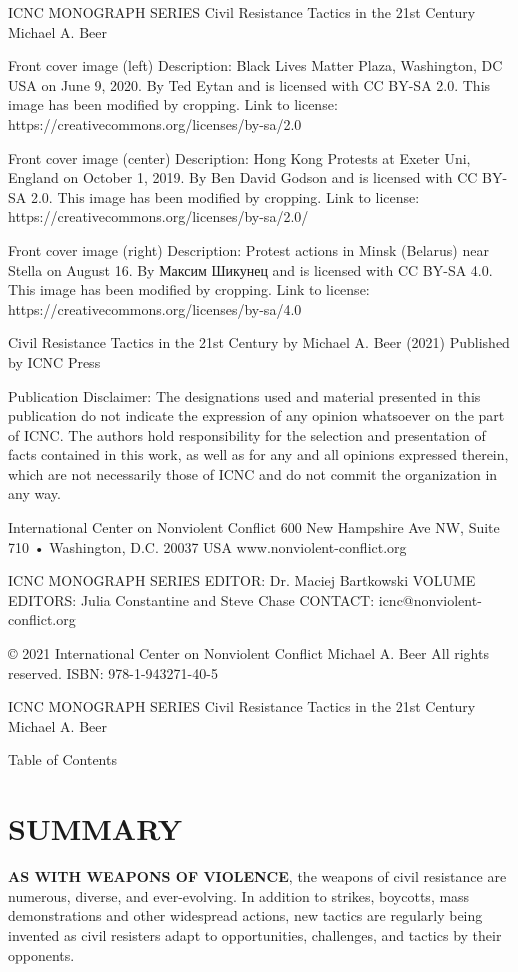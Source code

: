 \documentclass[twoside,a4paper,12pt,fleqn,openany]{extbook}
\begin{document}
ICNC MONOGRAPH SERIES
Civil Resistance
Tactics in the 21st Century
Michael A. Beer

Front cover image (left)
Description: Black Lives Matter Plaza, Washington, DC USA on June 9, 2020.
By Ted Eytan and is licensed with CC BY-SA 2.0.
This image has been modified by cropping.
Link to license: https://creativecommons.org/licenses/by-sa/2.0

Front cover image (center)
Description: Hong Kong Protests at Exeter Uni, England on October 1, 2019.
By Ben David Godson and is licensed with CC BY-SA 2.0.
This image has been modified by cropping.
Link to license: https://creativecommons.org/licenses/by-sa/2.0/

Front cover image (right)
Description: Protest actions in Minsk (Belarus) near Stella on August 16.
By Максим Шикунец and is licensed with CC BY-SA 4.0.
This image has been modified by cropping.
Link to license: https://creativecommons.org/licenses/by-sa/4.0

Civil Resistance Tactics in the 21st Century
by Michael A. Beer (2021)
Published by ICNC Press

Publication Disclaimer: The designations used and material presented in this publication
do not indicate the expression of any opinion whatsoever on the part of ICNC.
The authors hold responsibility for the selection and presentation of facts contained in
this work, as well as for any and all opinions expressed therein, which are not necessarily
those of ICNC and do not commit the organization in any way.

International Center on Nonviolent Conflict
600 New Hampshire Ave NW, Suite 710 • Washington, D.C. 20037 USA
www.nonviolent-conflict.org

ICNC MONOGRAPH SERIES EDITOR: Dr. Maciej Bartkowski
VOLUME EDITORS: Julia Constantine and Steve Chase
CONTACT: icnc@nonviolent-conflict.org

© 2021 International Center on Nonviolent Conflict
Michael A. Beer
All rights reserved.
ISBN: 978-1-943271-40-5

ICNC MONOGRAPH SERIES
Civil Resistance Tactics in the 21st Century
Michael A. Beer

Table of Contents

\chapter*{SUMMARY}

\textbf{AS WITH WEAPONS OF VIOLENCE}, the weapons of civil resistance are numerous, diverse, and ever-evolving.
In addition to strikes, boycotts, mass demonstrations and other widespread
actions, new tactics are regularly being invented as civil resisters adapt to opportunities, challenges, and tactics by their opponents.
\end{document}
